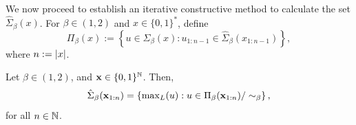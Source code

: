 We now proceed to establish an iterative constructive method to calculate the set $\hat \Sigma_\beta(x)$. For $\beta \in (1,2)$ and $x \in \{0,1\}^\ast$, define 
\begin{equation}\label{eq:definition of pi beta, the transition set between sigma hat beta n and sigma hat beta n 1}
    \Pi_\beta(x) := \left\{u \in \Sigma_\beta(x) : u_{1:n-1} \in \hat \Sigma_\beta(x_{1:n-1})\right\},
\end{equation}
where $n := \left| x \right|$.
\begin{theorem}
    Let $\beta \in (1,2)$, and ${\bf x} \in \{0,1\}^{\mathbb{N}}$. Then,
    \begin{equation}
        \hat\Sigma_\beta({\bf x}_{1:n}) = \left\{ \mathop{\operatorname{max}_L} (u) : u \in \Pi_\beta({\bf x}_{1:n}) / \sim_\beta\right\},
    \end{equation}
    for all $n \in \mathbb{N}$.
\end{theorem}
